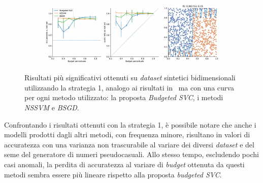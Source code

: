 \begin{figure}[ht]
    \hfill
    \begin{subfigure}{.9\textwidth}
        \centering
        \includegraphics[width=\textwidth]{img/comp_old/15.pdf}
    \end{subfigure}
\caption[Risultati su \emph{dataset} sintetici utilizzando strategia 1 in confronto ad altri metodi.]{Risultati più significativi ottenuti su \emph{dataset} sintetici bidimensionali utilizzando la strategia 1, analogo ai risultati in~ ma con una curva per ogni metodo utilizzato: la proposta \emph{Budgeted SVC}, i metodi \emph{NSSVM} e \emph{BSGD}.}
\label{fig:comp_old}
\end{figure}
Confrontando i risultati ottenuti con la strategia 1, è possibile notare che anche i modelli prodotti dagli altri metodi, con frequenza minore, risultano in valori di accuratezza con una varianza non trascurabile al variare dei diversi \emph{dataset} e del seme del generatore di numeri pseudocasuali.
Allo stesso tempo, escludendo pochi casi anomali, la perdita di accuratezza al variare di \emph{budget} ottenuta da questi metodi sembra essere più lineare rispetto alla proposta \emph{budgeted SVC}.
